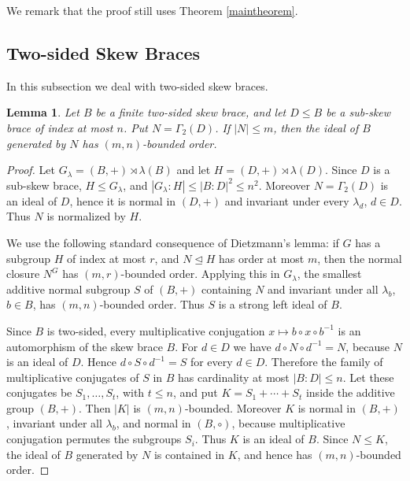 \documentclass[11pt, oneside]{amsart}
\numberwithin{equation}{section}
\theoremstyle{plain}
\newtheorem{lemma}[equation]{Lemma}
\theoremstyle{definition}
\begin{document}
We remark that  the proof still uses Theorem \ref{maintheorem}. 





\subsection{Two-sided Skew Braces}

In this subsection we deal with two-sided skew braces.
\begin{lemma}\label{lem:bounded-ideal-closure-two-sided}
Let $B$ be a finite two-sided skew brace, and let $D\leqslant B$ be a
sub-skew brace of index at most $n$. Put $N=\Gamma_2(D)$. If $|N|\leqslant m$,
then the ideal of $B$ generated by $N$ has $(m,n)$-bounded order.
\end{lemma}

\begin{proof}
Let $G_\lambda=(B,+)\rtimes\lambda(B)$ and let
$H=(D,+)\rtimes\lambda(D)$. Since $D$ is a sub-skew brace, $H\leqslant G_\lambda$,
and $|G_\lambda:H| \leqslant |B:D|^2\leqslant n^2$. Moreover $N=\Gamma_2(D)$ is an
ideal of $D$, hence it is normal in $(D,+)$ and invariant under every
$\lambda_d$, $d\in D$. Thus $N$ is normalized by $H$.

We use the following standard consequence of Dietzmann's lemma: if $G$ has
a subgroup $H$ of index at most $r$, and $N\unlhd H$ has order at most $m$,
then the normal closure $N^G$ has $(m,r)$-bounded order. Applying this in
$G_\lambda$, the smallest additive normal subgroup $S$ of $(B,+)$ containing
$N$ and invariant under all $\lambda_b$, $b\in B$, has $(m,n)$-bounded order.
Thus $S$ is a strong left ideal of $B$.

Since $B$ is two-sided, every multiplicative conjugation
$x\mapsto b\circ x\circ b^{-1}$ is an automorphism of the skew brace $B$.
For $d\in D$ we have $d\circ N\circ d^{-1}=N$, because $N$ is an ideal of
$D$. Hence $d\circ S\circ d^{-1}=S$ for every $d\in D$. Therefore the family
of multiplicative conjugates of $S$ in $B$ has cardinality at most
$|B:D| \leqslant n$. Let these conjugates be $S_1,\ldots,S_t$, with $t\leqslant n$, and
put $K=S_1+\cdots+S_t$ inside the additive group $(B,+)$. Then $|K|$ is
$(m,n)$-bounded. Moreover $K$ is normal in $(B,+)$, invariant under all
$\lambda_b$, and normal in $(B,\circ)$, because multiplicative conjugation
permutes the subgroups $S_i$. Thus $K$ is an ideal of $B$. Since
$N\leqslant K$, the ideal of $B$ generated by $N$ is contained in $K$, and hence
has $(m,n)$-bounded order.
\end{proof}
\end{document}
